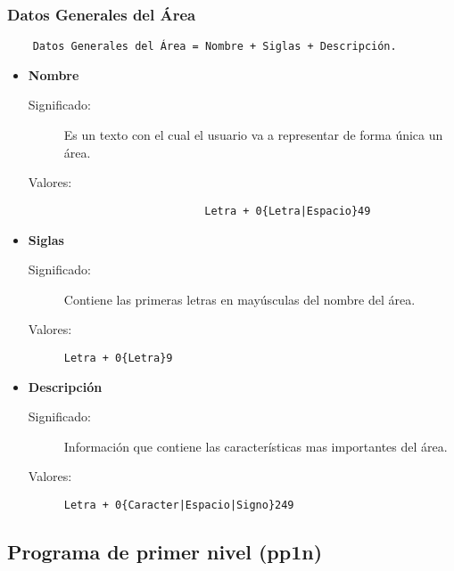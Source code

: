 \subsubsection{Datos Generales del Área}
\label{DatosGenerales_PS}
\begin{lstlisting}
	Datos Generales del Área = Nombre + Siglas + Descripción.
\end{lstlisting}
\begin{itemize}
	\item	\textbf{Nombre}
		\begin{description}
			\item [Significado:] Es un texto con el cual el usuario va a representar de forma única un área.
			\item [Valores:]{\begin{lstlisting}
					  Letra + 0{Letra|Espacio}49
					 \end{lstlisting}}
		\end{description}
	\item	\textbf{Siglas}
		\begin{description}
			\item [Significado:] Contiene las primeras letras en mayúsculas del nombre del área.
			\item [Valores:]{\begin{lstlisting}
Letra + 0{Letra}9\end{lstlisting}}
		\end{description}
	\item	\textbf{Descripción}
		\begin{description}
			\item [Significado:] Información que contiene las características mas importantes del área.
			\item [Valores:]{\begin{lstlisting}
Letra + 0{Caracter|Espacio|Signo}249\end{lstlisting}}
		\end{description}
\end{itemize}



\subsection{Programa de primer nivel (pp1n)}\label{dd:Pp1n}

